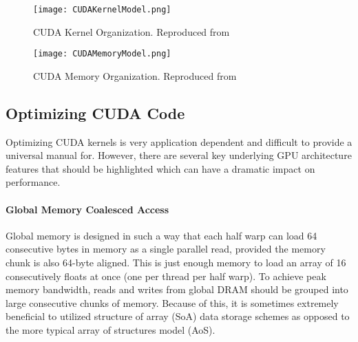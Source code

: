 \begin{figure}[!htpb]
    \centering
    \texttt{[image: CUDAKernelModel.png]}
    \caption{CUDA Kernel Organization. Reproduced from \cite{cudadocumentation}}
    \label{fig:kernelorganization}
\end{figure}

\begin{figure}[!htpb]
    \centering
    \texttt{[image: CUDAMemoryModel.png]}
    \caption{CUDA Memory Organization. Reproduced from \cite{gep3d}}
    \label{fig:cudamemoryorganization}
\end{figure}

\subsection{Optimizing CUDA Code}
Optimizing CUDA kernels is very application dependent and difficult to provide a universal manual for. However, there are several key underlying GPU architecture features that should be highlighted which can have a dramatic impact on performance.
\paragraph{Global Memory Coalesced Access} Global memory is designed in such a way that each half warp can load 64 consecutive bytes in memory as a single parallel read, provided the memory chunk is also 64-byte aligned. This is just enough memory to load an array of 16 consecutively floats at once (one per thread per half warp). To achieve peak memory bandwidth, reads and writes from global DRAM should be grouped into large consecutive chunks of memory. Because of this, it is sometimes extremely beneficial to utilized structure of array (SoA) data storage schemes as opposed to the more typical array of structures model (AoS).
